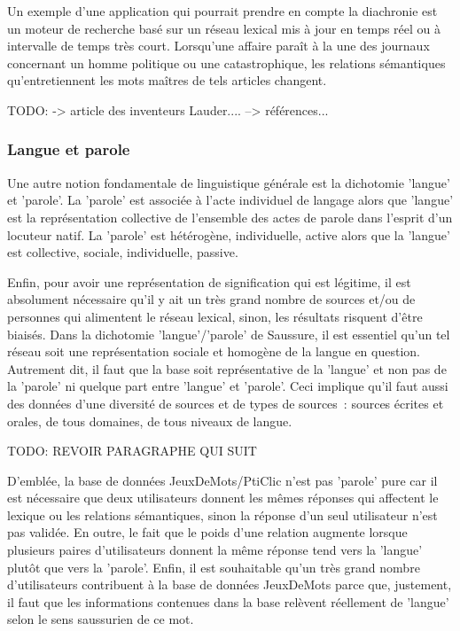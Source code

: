 \documentclass[a4paper,11pt,french]{article}
\begin{document}
Un exemple d'une application qui pourrait prendre en compte la diachronie est un moteur de recherche basé sur un réseau lexical mis à jour en temps réel ou à intervalle de temps très court. Lorsqu'une affaire paraît à la une des journaux concernant un homme politique ou une catastrophique, les relations sémantiques qu'entretiennent les mots maîtres de tels articles changent.

TODO:
-> article des inventeurs Lauder.... 
--> références...

\subsubsection{Langue et parole}

Une autre notion fondamentale de linguistique générale est la dichotomie 'langue' et 'parole'. La 'parole' est associée à l'acte individuel de langage alors que 'langue' est la représentation collective de l'ensemble des actes de parole dans l'esprit d'un locuteur natif. La 'parole' est hétérogène, individuelle, active alors que la 'langue' est collective, sociale, individuelle, passive. 

Enfin, pour avoir une représentation de signification qui est légitime, il est absolument nécessaire qu'il y ait un très grand nombre de sources et/ou de personnes qui alimentent le réseau lexical, sinon, les résultats risquent d'être biaisés. Dans la dichotomie 'langue'/'parole' de Saussure, il est essentiel qu'un tel réseau soit une représentation sociale et homogène de la langue en question. Autrement dit, il faut que la base soit représentative de la 'langue' et non pas de la 'parole' ni quelque part entre 'langue' et 'parole'. Ceci implique qu'il faut aussi des données d'une diversité de sources et de types de sources~: sources écrites et orales, de tous domaines, de tous niveaux de langue. 

TODO: REVOIR PARAGRAPHE QUI SUIT

D'emblée, la base de données JeuxDeMots/PtiClic n'est pas 'parole' pure car il est nécessaire que deux utilisateurs donnent les mêmes réponses qui affectent le lexique ou les relations sémantiques, sinon la réponse d'un seul utilisateur n'est pas validée. En outre, le fait que le poids d'une relation augmente lorsque plusieurs paires d'utilisateurs donnent la même réponse tend vers la 'langue' plutôt que vers la 'parole'. Enfin, il est souhaitable qu'un très grand nombre d'utilisateurs contribuent à la base de données JeuxDeMots parce que, justement, il faut que les informations contenues dans la base relèvent réellement de 'langue' selon le sens saussurien de ce mot. 
\end{document}
